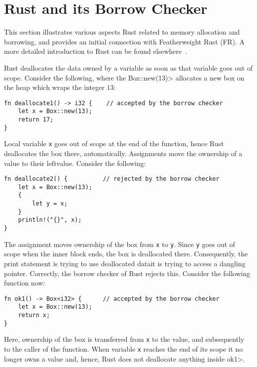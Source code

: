 \section{Rust and its Borrow Checker}\label{sec:rust}

This section illustrates various aspects Rust related to memory
allocation and borrowing, and provides an initial connection with
Featherweight Rust (FR).  A more detailed introduction to Rust can be
found elsewhere~\cite{RustBook,Rustonomicon}.

Rust deallocates the data owned by a variable as soon as that variable
goes out of scope. Consider the following, where the \<Box::new(13)>
allocates a new box on the heap which wraps the integer $13$:

\begin{lstlisting}
fn deallocate1() -> i32 {    // accepted by the borrow checker
    let x = Box::new(13);
    return 17;
}
\end{lstlisting}

\noindent
Local variable \lstinline{x} goes out of scope at the end of the
function, hence Rust deallocates the box there, automatically.
Assignments move the ownership of a value to their leftvalue. Consider
the following:

\begin{lstlisting}
fn deallocate2() {          // rejected by the borrow checker
    let x = Box::new(13);
    {
        let y = x;
    }
    println!("{}", x);
}
\end{lstlisting}

\noindent
The assignment moves ownership of the box from \lstinline{x} to
\lstinline{y}.  Since \lstinline{y} goes out of scope when the inner
block ends, the box is deallocated there. Consequently, the print
statement is trying to use deallocated data\ie it is trying to access
a dangling pointer.  Correctly, the borrow checker of Rust rejects
this.  Consider the following function now:

\begin{lstlisting}
fn ok1() -> Box<i32> {      // accepted by the borrow checker
    let x = Box::new(13);
    return x;
}
\end{lstlisting}

\noindent
Here, ownership of the box is transferred from \lstinline{x} to the
value, and subsequently to the caller of the function.  When variable
\lstinline{x} reaches the end of its scope it no longer owns a value
and, hence, Rust does not deallocate anything inside \<ok1>.

